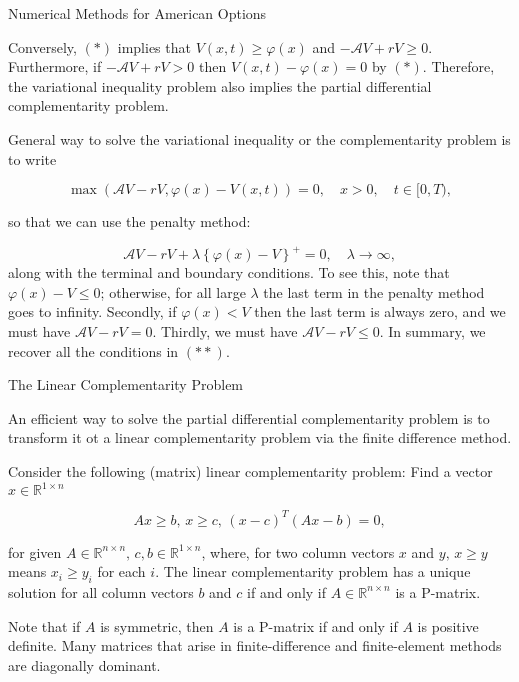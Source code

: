 \documentclass{beamer}
\begin{document}
\begin{frame}{Numerical Methods for American Options}

    {\footnotesize \footnotesize
    Conversely, $(*)$ implies that \(V(x,t) \geq \varphi(x)\) 
    and \(-\mathcal{A} V + rV \geq 0\). Furthermore, if \(-\mathcal{A}V + rV > 0\) then \(V(x,t) - \varphi(x) = 0\) by $(*)$. 
    Therefore, the variational inequality problem also implies the partial differential complementarity problem.
    \vspace{1em}

       General way to solve the variational inequality or the complementarity problem is to write

    \[
    \max(\mathcal{A} V - rV, \varphi(x) - V(x,t)) = 0, \quad x > 0, \quad t \in [0,T), \tag{**}
    \]

     \pause so that we can use the penalty method:

    \[
    \mathcal{A} V - rV + \lambda \left\{ \varphi(x) - V \right\}^+ = 0, \quad \lambda \to \infty,
    \]
    along with the terminal and boundary conditions.
     To see this, note that \(\varphi(x) - V \leq 0\); otherwise, 
     for all large \(\lambda\) the last term in the penalty method goes to infinity.
      Secondly, if \(\varphi(x) < V\) then the last term is always zero, and we must have \(\mathcal{A} V - rV = 0\). 
    Thirdly, we must have \(\mathcal{A} V - rV \leq 0\). In summary, we recover all the conditions in $(**)$.
        }
\end{frame}

\begin{frame}{The Linear Complementarity Problem}

    {\footnotesize \footnotesize
    An efficient way to solve the partial differential complementarity problem is
    to transform it ot a linear complementarity problem via the finite difference
    method.
    \vspace{1em}

    Consider the following (matrix) linear complementarity problem: 
    Find a vector \( x \in \mathbb{R}^{1 \times n} \)

    \[
    Ax \geq b, \, x \geq c, \, (x - c)^T (Ax - b) = 0,
    \]

    for given \( A \in \mathbb{R}^{n \times n}, \, c, b \in \mathbb{R}^{1 \times n} \), where, 
    for two column vectors \( x \) and \( y, \, x \geq y \) means \( x_i \geq y_i \) for each \( i \).
    The linear complementarity problem has a unique solution for all
     column vectors \( b \) and \( c \) if and only if \( A \in \mathbb{R}^{n \times n} \) is a P-matrix.
    \vspace{1em}
    
     \pause Note that if \( A \) is symmetric, then \( A \) is a P-matrix if and only if \( A \) is positive definite.
     Many matrices that arise in finite-difference and finite-element methods are diagonally dominant.
    }
    
\end{frame}
\end{document}

